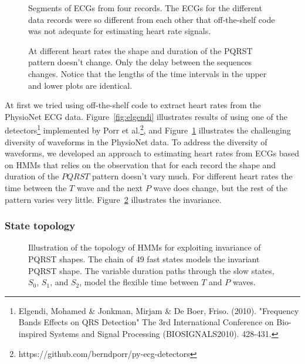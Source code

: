 \begin{figure}
  \caption[Segments of ECGs from four records]%
  {Segments of ECGs from four records.  The ECGs for the different
    data records were so different from each other that off-the-shelf
    code was not adequate for estimating heart rate signals.}
  \label{fig:a03a10b03c02}
\end{figure}

\begin{figure}
  \caption[Invariant PQRST shape]%
  {At different heart rates the shape and duration of the PQRST
    pattern doesn’t change. Only the delay between the sequences
    changes.  Notice that the lengths of the time intervals in the
    upper and lower plots are identical.}
  \label{fig:constant_a03}
\end{figure}

At first we tried using off-the-shelf code to extract heart rates from
the PhysioNet ECG data.  Figure~\ref{fig:elgendi} illustrates results
of using one of the detectors\footnote{Elgendi, Mohamed \& Jonkman,
  Mirjam \& De Boer, Friso. (2010). "Frequency Bands Effects on QRS
  Detection" The 3rd International Conference on Bio-inspired Systems
  and Signal Processing (BIOSIGNALS2010). 428-431.} implemented by
Porr et al.\footnote{https://github.com/berndporr/py-ecg-detectors},
and Figure~\ref{fig:a03a10b03c02} illustrates the challenging
diversity of waveforms in the PhysioNet data.    To address the diversity of
waveforms, we developed an approach to estimating heart rates from
ECGs based on HMMs that relies on the observation that for each record
the shape and duration of the $PQRST$ pattern doesn't vary much.  For
different heart rates the time between the $T$ wave and the next $P$
wave does change, but the rest of the pattern varies very little.
Figure~\ref{fig:constant_a03} illustrates the invariance.

\subsubsection{State topology}
\label{sec:state_topology}

\begin{figure}
  \centering{\resizebox{0.5\textwidth}{!}{}
  }
  \caption[Topology of HMMs for exploiting invariance of PQRST
  shapes]{Illustration of the topology of HMMs for exploiting
    invariance of PQRST shapes. The chain of 49 fast states models the
    invariant PQRST shape.  The variable duration paths through the
    slow states, $S_0$, $S_1$, and $S_2$, model the flexible time
    between $T$ and $P$ waves.}
  \label{fig:ecg_hmm}
\end{figure}

